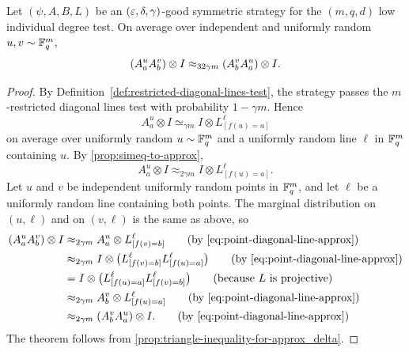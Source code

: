 \begin{theorem}\label{thm:commutativity-points}
	\leanok
	Let $(\psi,A,B,L)$ be an $(\varepsilon,\delta,\gamma)$-good symmetric strategy for the $(m,q,d)$ low individual degree test.
	On average over independent and uniformly random $u,v \sim \mathbb{F}_q^m$,
	\[
		(A_a^u A_b^v) \otimes I \approx_{32\gamma m} (A_b^v A_a^u) \otimes I.
	\]
\end{theorem}
\begin{proof}
	\leanok
	By Definition~\ref{def:restricted-diagonal-lines-test}, the strategy passes the $m$-restricted diagonal lines test with probability $1-\gamma m$. Hence
	\[
		A_a^u \otimes I \simeq_{\gamma m} I \otimes L^\ell_{[f(u)=a]}
	\]
	on average over uniformly random $u \sim \mathbb{F}_q^m$ and a uniformly random line $\ell$ in $\mathbb{F}_q^m$ containing $u$. By \ref{prop:simeq-to-approx},
	\begin{equation}\label{eq:point-diagonal-line-approx}
		A_a^u \otimes I \approx_{2\gamma m} I \otimes L^\ell_{[f(u)=a]}.
	\end{equation}
	Let $u$ and $v$ be independent uniformly random points in $\mathbb{F}_q^m$, and let $\ell$ be a uniformly random line containing both points. The marginal distribution on $(u,\ell)$ and on $(v,\ell)$ is the same as above, so
	\begin{align*}
		(A_a^u A_b^v) \ot I
		 & \approx_{2\gamma m} A_a^u \otimes L^\ell_{[f(v)=b]} \tag{by \ref{eq:point-diagonal-line-approx}}                           \\
		 & \approx_{2\gamma m} I \otimes \bigl(L^\ell_{[f(v)=b]} L^\ell_{[f(u)=a]}\bigr) \tag{by \ref{eq:point-diagonal-line-approx}} \\
		 & = I \otimes \bigl(L^\ell_{[f(u)=a]} L^\ell_{[f(v)=b]}\bigr) \tag{because~$L$ is projective}                                \\
		 & \approx_{2\gamma m} A_b^v \otimes L^\ell_{[f(u)=a]} \tag{by \ref{eq:point-diagonal-line-approx}}                           \\
		 & \approx_{2\gamma m} (A_b^v A_a^u) \ot I. \tag{by \ref{eq:point-diagonal-line-approx}}
	\end{align*}
	The theorem follows from \ref{prop:triangle-inequality-for-approx_delta}.
\end{proof}

